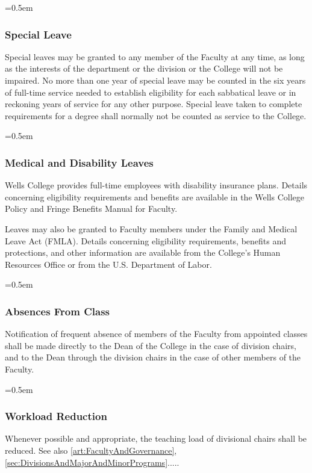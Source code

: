 \documentclass{manual}
\let\oldsubsubsection\subsubsection
\renewcommand\subsubsection{\leftskip=0.5em\oldsubsubsection}
\begin{document}
\subsubsection{Special Leave}\label{sec:FacultyCommittees.B}
Special leaves may be granted to any member of the Faculty at any time, as long as the interests of the department or the division or the College will not be impaired. No more than one year of special leave may be counted in the six years of full-time service needed to establish eligibility for each sabbatical leave or in reckoning years of service for any other purpose. Special leave taken to complete requirements for a degree shall normally not be counted as service to the College.

\subsubsection{Medical and Disability Leaves}
Wells College provides full-time employees with disability insurance plans. Details concerning eligibility requirements and benefits are available in the Wells College Policy and Fringe Benefits Manual for Faculty.

Leaves may also be granted to Faculty members under the Family and Medical Leave Act (FMLA). Details concerning eligibility requirements, benefits and protections, and other information are available from the College's Human Resources Office or from the U.S. Department of Labor.

\subsubsection{Absences From Class}
Notification of frequent absence of members of the Faculty from appointed classes shall be made directly to the Dean of the College in the case of division chairs, and to the Dean through the division chairs in the case of other members of the Faculty.

\subsubsection{Workload Reduction} \label{sub:WorkloadReduction}
Whenever possible and appropriate, the teaching load of divisional chairs shall be reduced. See also \cref{art:FacultyAndGovernance}, \cref{sec:DivisionsAndMajorAndMinorPrograms}.....
\end{document}
